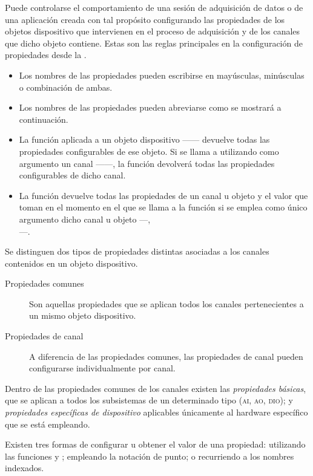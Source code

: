 Puede controlarse el comportamiento de una sesión de adquisición de datos o de una aplicación creada con tal propósito configurando las propiedades de los objetos dispositivo que intervienen en el proceso de adquisición y de los canales que dicho objeto contiene. Estas son las reglas principales en la configuración de propiedades desde la \datx{}.

\begin{itemize}
	\item Los nombres de las propiedades pueden escribirse en mayúsculas, minúsculas o combinación de ambas.
	\item Los nombres de las propiedades pueden abreviarse como se mostrará a continuación. %
	\item La función  aplicada a un objeto dispositivo ------ devuelve todas las propiedades configurables de ese objeto. Si se llama a  utilizando como argumento un canal ------, la función devolverá todas las propiedades configurables de dicho canal.
	\item La función  devuelve todas las propiedades de un canal u objeto y el valor que toman en el momento en el que se llama a la función si se emplea como único argumento dicho canal u objeto ---, \\ ---.
\end{itemize}

Se distinguen dos tipos de propiedades distintas asociadas a los canales contenidos en un objeto dispositivo.

\begin{description}
	\item[Propiedades comunes] Son aquellas propiedades que se aplican todos los canales pertenecientes a un mismo objeto dispositivo.
	\item[Propiedades de canal] A diferencia de las propiedades comunes, las propiedades de canal pueden configurarse individualmente por canal.
\end{description}

Dentro de las propiedades comunes de los canales existen las \emph{propiedades básicas}, que se aplican a todos los subsistemas de un determinado tipo (\textsc{ai, ao, dio}); y \emph{propiedades específicas de dispositivo} aplicables únicamente al hardware específico que se está empleando.\par
Existen tres formas de configurar u obtener el valor de una propiedad: utilizando las funciones  y ; empleando la notación de punto; o recurriendo a los nombres indexados.

